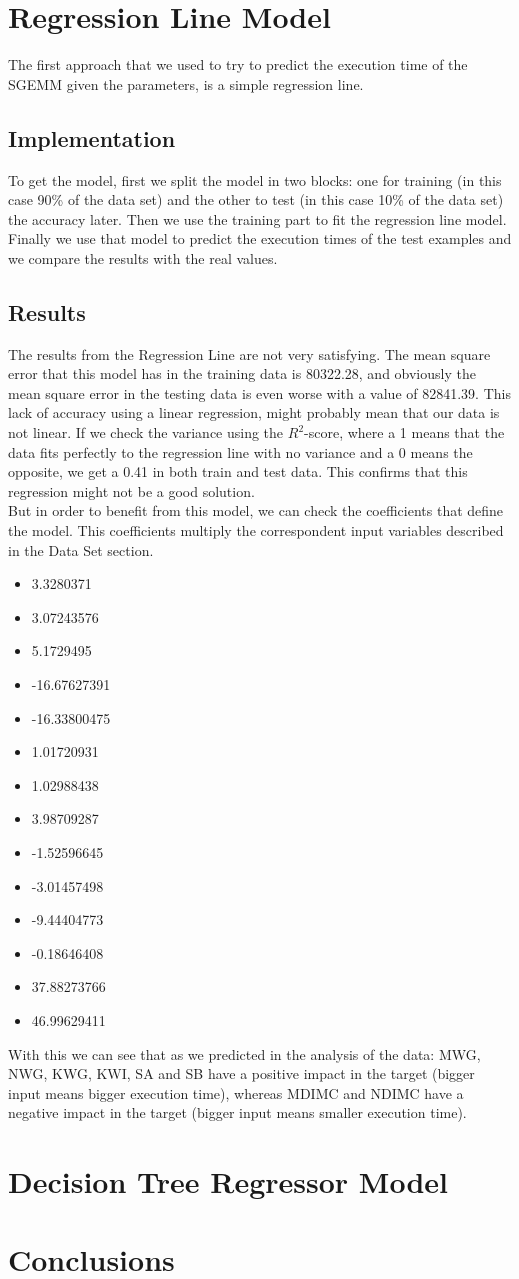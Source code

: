 \documentclass[sigconf,authorversion]{acmart}
\begin{document}
\section{Regression Line Model}
The first approach that we used to try to predict the execution time of the SGEMM given the parameters, is a simple regression line.
\subsection{Implementation}
To get the model, first we split the model in two blocks: one for training (in this case 90\% of the data set) and the other to test (in this case 10\% of the data set) the accuracy later. Then we use the training part to fit the regression line model. Finally we use that model to predict the execution times of the test examples and we compare the results with the real values.
\subsection{Results}
The results from the Regression Line are not very satisfying. The mean square error that this model has in the training data is 80322.28, and obviously the mean square error in the testing data is even worse with a value of 82841.39. This lack of accuracy using a linear regression, might probably mean that our data is not linear. If we check the variance using the $R^2$-score, where a 1 means that the data fits perfectly to the regression line with no variance and a 0 means the opposite, we get a 0.41 in both train and test data. This confirms that this regression might not be a good solution.\\
But in order to benefit from this model, we can check the coefficients that define the model. This coefficients multiply the correspondent input variables described in the Data Set section.
\begin{itemize}
  \item 3.3280371
  \item 3.07243576
  \item 5.1729495
  \item -16.67627391
  \item -16.33800475
  \item 1.01720931
  \item 1.02988438
  \item 3.98709287
  \item -1.52596645
  \item -3.01457498
  \item -9.44404773
  \item -0.18646408
  \item 37.88273766
  \item 46.99629411
\end{itemize}
With this we can see that as we predicted in the analysis of the data: MWG, NWG, KWG, KWI, SA and SB have a positive impact in the target (bigger input means bigger execution time), whereas MDIMC and NDIMC have a negative impact in the target (bigger input means smaller execution time).
\section{Decision Tree Regressor Model}
\section{Conclusions}



\end{document}
